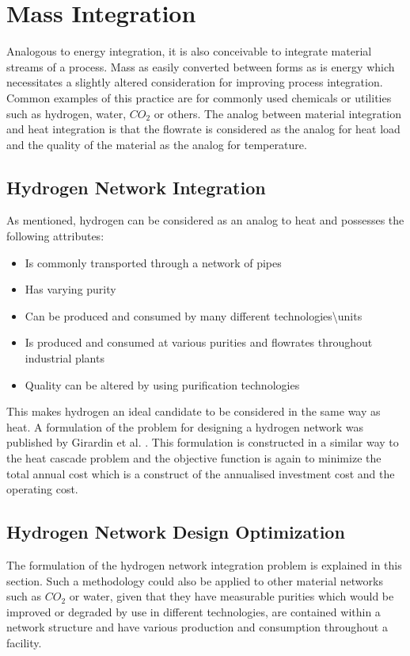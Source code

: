 \section{Mass Integration}

Analogous to energy integration, it is also conceivable to integrate material streams of a process. Mass as easily converted between forms as is energy which necessitates a slightly altered consideration for improving process integration. Common examples of this practice are for commonly used chemicals or utilities such as hydrogen, water, $CO_2$ or others. The analog between material integration and heat integration is that the flowrate is considered as the analog for heat load and the quality of the material as the analog for temperature. 

\subsection{Hydrogen Network Integration}
As mentioned, hydrogen can be considered as an analog to heat and possesses the following attributes:
\begin{itemize}
\item Is commonly transported through a network of pipes
\item Has varying purity
\item Can be produced and consumed by many different technologies\textbackslash units
\item Is produced and consumed at various purities and flowrates throughout industrial plants
\item Quality can be altered by using purification technologies
\end{itemize}

This makes hydrogen an ideal candidate to be considered in the same way as heat. A formulation of the problem for designing a hydrogen network was published by Girardin et al. \cite{girardin_methodology_2006}. This formulation is constructed in a similar way to the heat cascade problem and the objective function is again to minimize the total annual cost which is a construct of the annualised investment cost and the operating cost.

\subsection{Hydrogen Network Design Optimization}
The formulation of the hydrogen network integration problem is explained in this section. Such a methodology could also be applied to other material networks such as $CO_2$ or water, given that they have measurable purities which would be improved or degraded by use in different technologies, are contained within a network structure and have various production and consumption throughout a facility.  